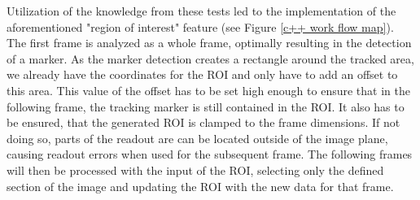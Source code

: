 Utilization of the knowledge from these tests led to the implementation of the aforementioned "region of interest" feature (see Figure \ref{c++ work flow map}).
The first frame is analyzed as a whole frame, optimally resulting in the detection of a marker. As the marker detection creates a rectangle around the tracked area, we already have the coordinates for the ROI and only have to add an offset to this area. This value of the offset has to be set high enough to ensure that in the following frame, the tracking marker is still contained in the ROI. It also has to be ensured, that the generated ROI is clamped to the frame dimensions. If not doing so, parts of the readout are can be located outside of the image plane, causing readout errors when used for the subsequent frame. The following frames will then be processed with the input of the ROI, selecting only the defined section of the image and updating the ROI with the new data for that frame.

